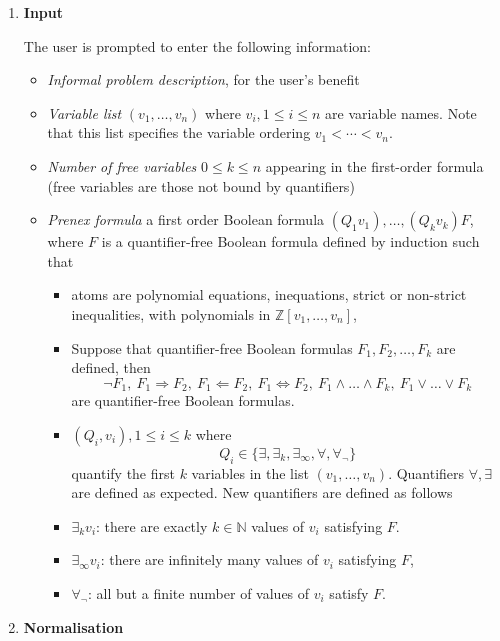 \documentclass[
]{book}
\providecommand{\tightlist}{%
  \setlength{\itemsep}{0pt}\setlength{\parskip}{0pt}}
\theoremstyle{definition}
\theoremstyle{definition}
\theoremstyle{definition}
\theoremstyle{definition}
\theoremstyle{remark}
\begin{document}
\begin{enumerate}
\def\labelenumi{\arabic{enumi}.}
\item
  \textbf{Input}

  The user is prompted to enter the following information:

  \begin{itemize}
  \tightlist
  \item
    \emph{Informal problem description}, for the user's benefit
  \item
    \emph{Variable list} \((v_1,\ldots,v_n)\) where \(v_i, 1 \le i \le n\) are variable names. Note that this list specifies the variable ordering \(v_1 < \cdots < v_n\).
  \item
    \emph{Number of free variables} \(0 \le k \le n\) appearing in the first-order formula (free variables are those not bound by quantifiers)
  \item
    \emph{Prenex formula} a first order Boolean formula \((Q_1 v_1), \ldots, (Q_k v_k) F\), where \(F\) is a quantifier-free Boolean formula defined by induction such that

    \begin{itemize}
    \tightlist
    \item
      atoms are polynomial equations, inequations, strict or non-strict inequalities, with polynomials in \(\mathbb{Z}[v_1,\ldots,v_n]\),
    \item
      Suppose that quantifier-free Boolean formulas \(F_1, F_2,\ldots,F_k\) are defined, then
      \[
      \neg F_1,\> F_1 \Rightarrow F_2,\> F_1 \Leftarrow F_2,\> F_1 \Leftrightarrow F_2,\> F_1 \land \ldots \land F_k,\> F_1 \lor \ldots \lor F_k
      \]
      are quantifier-free Boolean formulas.
    \item
      \((Q_i,v_i), 1 \le i \le k\) where
      \[
      Q_i \in \{ \exists, \exists_k, \exists_\infty, \forall, \forall_\neg \}
      \]
      quantify the first \(k\) variables in the list \((v_1,\ldots,v_n)\). Quantifiers \(\forall, \exists\) are defined as expected. New quantifiers are defined as follows
    \item
      \(\exists_k v_i\): there are exactly \(k \in \mathbb{N}\) values of \(v_i\) satisfying \(F\).
    \item
      \(\exists_\infty v_i\): there are infinitely many values of \(v_i\) satisfying \(F\),
    \item
      \(\forall_\neg\): all but a finite number of values of \(v_i\) satisfy \(F\).
    \end{itemize}
  \end{itemize}
\item
  \textbf{Normalisation}


\end{enumerate}
\end{document}
